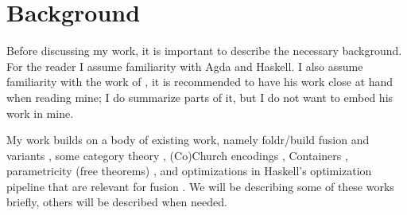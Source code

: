 
\section{Background}
Before discussing my work, it is important to describe the necessary background.
For the reader I assume familiarity with Agda and Haskell.
I also assume familiarity with the work of \cite{Harper2011}, it is recommended to have his work close at hand when reading mine; I do summarize parts of it, but I do not want to embed his work in mine.

My work builds on a body of existing work, namely foldr/build fusion and variants \citep{Gill1993,Svenningsson2002,Coutts2007}, some category theory \citep{Ahrens2022}, (Co)Church encodings \citep{Harper2011}, Containers \citep{Abbott2005}, parametricity (free theorems) \citep{Wadler1989}, and optimizations in Haskell's optimization pipeline that are relevant for fusion \citep{Jones1996}.
We will be describing some of these works briefly, others will be described when needed.



